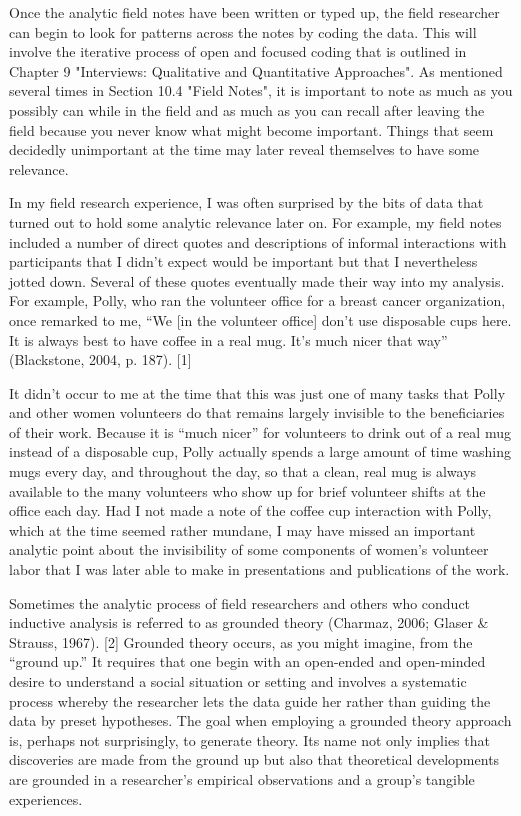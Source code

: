 Once the analytic field notes have been written or typed up, the field researcher can begin to look for patterns across the notes by coding the data. This will involve the iterative process of open and focused coding that is outlined in Chapter 9 "Interviews: Qualitative and Quantitative Approaches". As mentioned several times in Section 10.4 "Field Notes", it is important to note as much as you possibly can while in the field and as much as you can recall after leaving the field because you never know what might become important. Things that seem decidedly unimportant at the time may later reveal themselves to have some relevance.

In my field research experience, I was often surprised by the bits of data that turned out to hold some analytic relevance later on. For example, my field notes included a number of direct quotes and descriptions of informal interactions with participants that I didn’t expect would be important but that I nevertheless jotted down. Several of these quotes eventually made their way into my analysis. For example, Polly, who ran the volunteer office for a breast cancer organization, once remarked to me, “We [in the volunteer office] don’t use disposable cups here. It is always best to have coffee in a real mug. It’s much nicer that way” (Blackstone, 2004, p. 187). [1]

It didn’t occur to me at the time that this was just one of many tasks that Polly and other women volunteers do that remains largely invisible to the beneficiaries of their work. Because it is “much nicer” for volunteers to drink out of a real mug instead of a disposable cup, Polly actually spends a large amount of time washing mugs every day, and throughout the day, so that a clean, real mug is always available to the many volunteers who show up for brief volunteer shifts at the office each day. Had I not made a note of the coffee cup interaction with Polly, which at the time seemed rather mundane, I may have missed an important analytic point about the invisibility of some components of women’s volunteer labor that I was later able to make in presentations and publications of the work.

Sometimes the analytic process of field researchers and others who conduct inductive analysis is referred to as grounded theory (Charmaz, 2006; Glaser \& Strauss, 1967). [2] Grounded theory occurs, as you might imagine, from the “ground up.” It requires that one begin with an open-ended and open-minded desire to understand a social situation or setting and involves a systematic process whereby the researcher lets the data guide her rather than guiding the data by preset hypotheses. The goal when employing a grounded theory approach is, perhaps not surprisingly, to generate theory. Its name not only implies that discoveries are made from the ground up but also that theoretical developments are grounded in a researcher’s empirical observations and a group’s tangible experiences.

